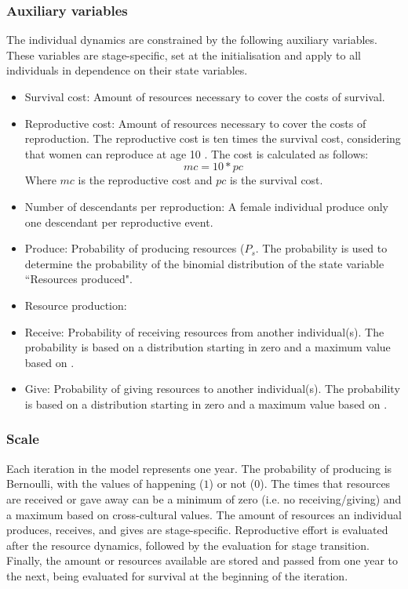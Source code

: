 \documentclass{article}
\begin{document}
\subsubsection{Auxiliary variables}

The individual dynamics are constrained by the following auxiliary variables. These variables are stage-specific, set at the initialisation and apply to all individuals in dependence on their state variables.

\begin{itemize}
    \item Survival cost: Amount of resources necessary to cover the costs of survival. \item Reproductive cost: Amount of resources necessary to cover the costs of reproduction. The reproductive cost is ten times the survival cost, considering that women can reproduce at age 10 \citep{davison2021human}. The cost is calculated as follows:
\begin{equation}
mc=10*pc    
\end{equation}
    Where $mc$ is the reproductive cost and $pc$ is the survival cost. 
    \item Number of descendants per reproduction: A female individual produce only one descendant per reproductive event.
    \item Produce: Probability of producing resources ($P_s$. The probability is used to determine the probability of the binomial distribution of the state variable ``Resources produced".
    \item Resource production: 
    \item Receive: Probability of receiving resources from another individual(s). The probability is based on a distribution starting in zero and a maximum value based on \cite{gurven2004give}.
    \item Give: Probability of giving resources to another individual(s). The probability is based on a distribution starting in zero and a maximum value based on \cite{gurven2004give}.
\end{itemize}

\subsubsection{Scale}

Each iteration in the model represents one year. The probability  of producing is Bernoulli, with the values of happening ($1$) or not ($0$). The times that resources are received or gave away can be a minimum of zero (i.e. no receiving/giving) and a maximum based on cross-cultural values. The amount of resources an individual produces, receives, and gives are stage-specific. Reproductive effort is evaluated after the resource dynamics, followed by the evaluation for stage transition. Finally, the amount or resources available are stored and passed from one year to the next, being evaluated for survival at the beginning of the iteration.
\end{document}
